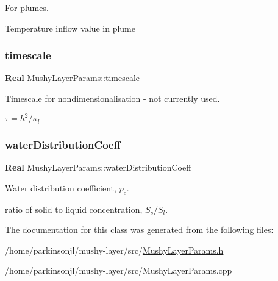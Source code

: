 For plumes. 

Temperature inflow value in plume \mbox{\label{class_mushy_layer_params_a77c66c8908da36411b789c07dd412eca}} 
\subsubsection{\texorpdfstring{timescale}{timescale}}
{\footnotesize\ttfamily \textbf{ Real} Mushy\+Layer\+Params\+::timescale}



Timescale for nondimensionalisation -\/ not currently used. 

$ \tau = h^2 / \kappa_l $ \mbox{\label{class_mushy_layer_params_a2b0038ec10c9660952ea88efd146a846}} 
\subsubsection{\texorpdfstring{water\+Distribution\+Coeff}{waterDistributionCoeff}}
{\footnotesize\ttfamily \textbf{ Real} Mushy\+Layer\+Params\+::water\+Distribution\+Coeff}



Water distribution coefficient, $ p_c $. 

ratio of solid to liquid concentration, $ S_s/S_l $. 

The documentation for this class was generated from the following files\+:\begin{DoxyCompactItemize}
\item 
/home/parkinsonjl/mushy-\/layer/src/\hyperlink{_mushy_layer_params_8h}{Mushy\+Layer\+Params.\+h}\item 
/home/parkinsonjl/mushy-\/layer/src/Mushy\+Layer\+Params.\+cpp\end{DoxyCompactItemize}
